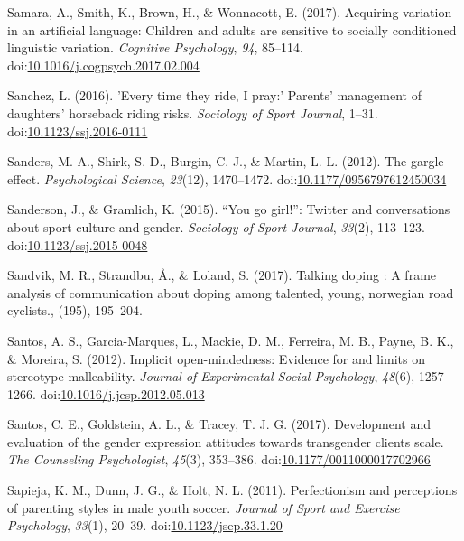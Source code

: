 \documentclass[english,man]{apa6}
\theoremstyle{definition}
\theoremstyle{definition}
\theoremstyle{definition}
\theoremstyle{remark}
\begin{document}
\hypertarget{ref-Samara2017}{}
Samara, A., Smith, K., Brown, H., \& Wonnacott, E. (2017). Acquiring
variation in an artificial language: Children and adults are sensitive
to socially conditioned linguistic variation. \emph{Cognitive
Psychology}, \emph{94}, 85--114.
doi:\href{https://doi.org/10.1016/j.cogpsych.2017.02.004}{10.1016/j.cogpsych.2017.02.004}

\hypertarget{ref-Sanchez2016}{}
Sanchez, L. (2016). 'Every time they ride, I pray:' Parents' management
of daughters' horseback riding risks. \emph{Sociology of Sport Journal},
1--31.
doi:\href{https://doi.org/10.1123/ssj.2016-0111}{10.1123/ssj.2016-0111}

\hypertarget{ref-Sanders2012}{}
Sanders, M. A., Shirk, S. D., Burgin, C. J., \& Martin, L. L. (2012).
The gargle effect. \emph{Psychological Science}, \emph{23}(12),
1470--1472.
doi:\href{https://doi.org/10.1177/0956797612450034}{10.1177/0956797612450034}

\hypertarget{ref-Sanderson2015}{}
Sanderson, J., \& Gramlich, K. (2015). ``You go girl!'': Twitter and
conversations about sport culture and gender. \emph{Sociology of Sport
Journal}, \emph{33}(2), 113--123.
doi:\href{https://doi.org/10.1123/ssj.2015-0048}{10.1123/ssj.2015-0048}

\hypertarget{ref-Sandvik2017}{}
Sandvik, M. R., Strandbu, Å., \& Loland, S. (2017). Talking doping : A
frame analysis of communication about doping among talented, young,
norwegian road cyclists., (195), 195--204.

\hypertarget{ref-Santos2012}{}
Santos, A. S., Garcia-Marques, L., Mackie, D. M., Ferreira, M. B.,
Payne, B. K., \& Moreira, S. (2012). Implicit open-mindedness: Evidence
for and limits on stereotype malleability. \emph{Journal of Experimental
Social Psychology}, \emph{48}(6), 1257--1266.
doi:\href{https://doi.org/10.1016/j.jesp.2012.05.013}{10.1016/j.jesp.2012.05.013}

\hypertarget{ref-Santos2017}{}
Santos, C. E., Goldstein, A. L., \& Tracey, T. J. G. (2017). Development
and evaluation of the gender expression attitudes towards transgender
clients scale. \emph{The Counseling Psychologist}, \emph{45}(3),
353--386.
doi:\href{https://doi.org/10.1177/0011000017702966}{10.1177/0011000017702966}

\hypertarget{ref-Sapieja2011}{}
Sapieja, K. M., Dunn, J. G., \& Holt, N. L. (2011). Perfectionism and
perceptions of parenting styles in male youth soccer. \emph{Journal of
Sport and Exercise Psychology}, \emph{33}(1), 20--39.
doi:\href{https://doi.org/10.1123/jsep.33.1.20}{10.1123/jsep.33.1.20}
\end{document}
